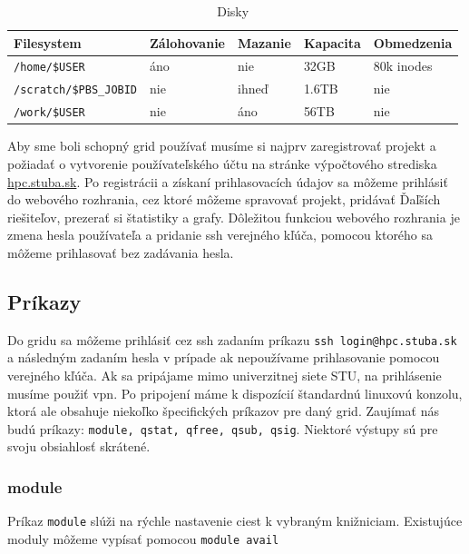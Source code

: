 \begin{table}[!h]
\centering
\begin{tabular}{@{}lllll@{}}
\toprule
\textbf{Filesystem}   & \textbf{Zálohovanie} & \textbf{Mazanie} & \textbf{Kapacita} & \textbf{Obmedzenia} \\ \midrule
\texttt{/home/\$USER}          & áno                  & nie              & 32GB              & 80k inodes          \\
\texttt{/scratch/\$PBS\_JOBID} & nie                  & ihneď            & 1.6TB             & nie                 \\
\texttt{/work/\$USER}          & nie                  & áno              & 56TB              & nie                 \\ \bottomrule
\end{tabular}
\caption{Disky}
\label{tab:filesystem}
\end{table}

Aby sme boli schopný grid používať musíme si najprv zaregistrovať projekt a požiadať o vytvorenie
používateľského účtu na stránke výpočtového strediska \url{hpc.stuba.sk}.
Po registrácii a získaní prihlasovacích údajov sa môžeme prihlásiť do webového rozhrania, cez ktoré môžeme spravovať projekt,
pridávať Ďaľších riešiteľov, prezerať si štatistiky a grafy.
Dôležitou funkciou webového rozhrania je zmena hesla používateľa a pridanie \acrshort{ssh} verejného kľúča, pomocou ktorého sa môžeme prihlasovať bez zadávania hesla.

\subsection{Príkazy}
Do gridu sa môžeme prihlásiť cez \acrshort{ssh} zadaním príkazu \texttt{ssh login@hpc.stuba.sk} a následným zadaním hesla v prípade ak nepoužívame prihlasovanie pomocou verejného kľúča.
Ak sa pripájame mimo univerzitnej siete STU, na prihlásenie musíme použiť \acrshort{vpn}.
Po pripojení máme k dispozícií štandardnú linuxovú konzolu, ktorá ale obsahuje niekoľko špecifických príkazov pre daný grid.
Zaujímať nás budú príkazy: \texttt{module, qstat, qfree, qsub, qsig}.
Niektoré výstupy sú pre svoju obsiahlosť skrátené.

\subsubsection{module}
Príkaz \texttt{module} slúži na rýchle nastavenie ciest k vybraným knižniciam. Existujúce moduly môžeme vypísať pomocou \texttt{module avail}

